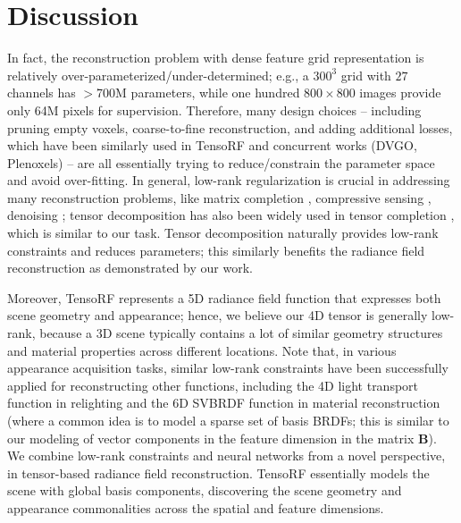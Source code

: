\documentclass[runningheads]{llncs}
\begin{document}
\section{Discussion}

In fact, the reconstruction problem with dense feature grid representation is relatively over-parameterized/under-determined; e.g., a $300^3$ grid with $27$ channels has $>$700M parameters, while one hundred $800\times800$ images provide only 64M pixels for supervision.
Therefore, many design choices -- including pruning empty voxels, coarse-to-fine reconstruction, and adding additional losses, which have been similarly used in TensoRF and concurrent works (DVGO, Plenoxels) -- are all essentially trying to reduce/constrain the parameter space and avoid over-fitting. 
In general, low-rank regularization is crucial in addressing many reconstruction problems, like matrix completion \cite{candes2010matrix}, compressive sensing \cite{dong2014compressive}, denoising \cite{ji2010robust};
tensor decomposition has also been widely used in tensor completion \cite{liu2012tensor,gandy2011tensor}, which is similar to our task. 
Tensor decomposition naturally provides low-rank constraints and reduces parameters; this similarly benefits the radiance field reconstruction as demonstrated by our work.

Moreover, TensoRF represents a 5D radiance field function that expresses both scene geometry and appearance;
hence, we believe our 4D tensor is generally low-rank, because a 3D scene typically contains a lot of similar geometry structures and material properties across different locations. 
Note that, in various appearance acquisition tasks, similar low-rank constraints have been successfully applied for reconstructing other functions, including the 4D light transport function in relighting \cite{wang2009kernel} and the 6D SVBRDF function in material reconstruction \cite{zhou2016sparse,nam2018practical} (where a common idea is to model a sparse set of basis BRDFs; this is similar to our modeling of vector components in the feature dimension in the matrix $\textbf{B}$).
We combine low-rank constraints and neural networks from a novel perspective, in tensor-based radiance field reconstruction.
TensoRF essentially models the scene with global basis components, discovering the scene geometry and appearance commonalities across the spatial and feature dimensions.
\end{document}
